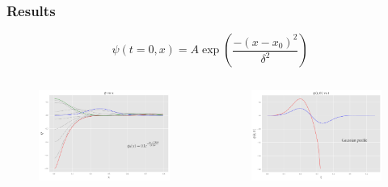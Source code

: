 \documentclass[hyperref={bookmarks=false},aspectratio=169]{beamer}
\begin{document}
\begin{frame}
  \frametitle{Results}

  \begin{equation*}
    \psi(t=0, x)=A \exp \left(\frac{-\left(x-x_{0}\right)^{2}}{\delta^{2}}\right)
  \end{equation*}

  \begin{columns}
    \begin{figure}
      \centering
      \includegraphics[width=1\linewidth]{images/super_Gaussian.pdf}
    \end{figure}
    \begin{figure}
      \centering
      \includegraphics[width=1\linewidth]{images/at0_Gaussian.pdf}
    \end{figure}
  \end{columns}

\end{frame}
\end{document}
